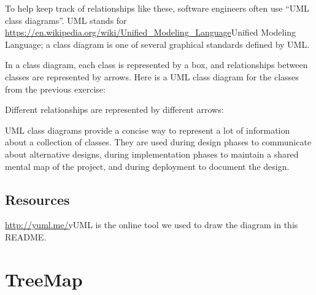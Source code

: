\documentclass[12pt]{book}
\theoremstyle{exercise}
\newcommand{\java}{\verb}%}
\begin{document}
{To help keep track of relationships like these, software engineers often
use ``UML class diagrams''. UML stands for
\url{https://en.wikipedia.org/wiki/Unified_Modeling_Language}{Unified
Modeling Language}; a class diagram is one of several graphical
standards defined by UML.

In a class diagram, each class is represented by a box, and
relationships between classes are represented by arrows. Here is a UML
class diagram for the classes from the previous exercise:


Different relationships are represented by different arrows:


UML class diagrams provide a concise way to represent a lot of
information about a collection of classes. They are used during design
phases to communicate about alternative designs, during implementation
phases to maintain a shared mental map of the project, and during
deployment to document the design.

\section{Resources}\label{resources-10}

\url{http://yuml.me/}{yUML} is the online tool we used to draw the
diagram in this README. 

\chapter{TreeMap}

}
\end{document}
